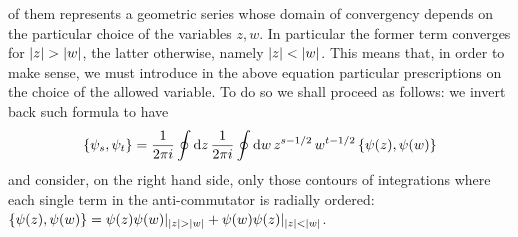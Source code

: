  of them represents a geometric series whose domain
 of convergency depends on the particular choice
 of the variables $z,w$. In particular the former
 term converges for $\lvert z\rvert>\lvert w\rvert$, the latter
 otherwise, namely $\lvert z\rvert<\lvert w\rvert$. This means that,
 in order to make sense, we must introduce in the above
 equation particular prescriptions on the choice of the
 allowed variable. To do so we shall proceed as follows:
 we invert back such formula to have
 \[
 \{\psi_s,\psi_t\}=\frac{1}{2\pi i}\oint \textrm{d} z\,
 \frac{1}{2\pi i}\oint \textrm{d} w\,z^{s-1/2}\,w^{t-1/2}\,
 \{\psi(z),\psi(w)\}
 \]
 and consider, on the right hand side, only those
 contours of integrations where each single term
 in the anti-commutator is radially ordered:
 $\{\psi(z),\psi(w)\}=\psi(z)\psi(w)|_{\lvert z\rvert>\lvert w\rvert}
 +\psi(w)\psi(z)|_{\lvert z\rvert<\lvert w\rvert}$. 
 
